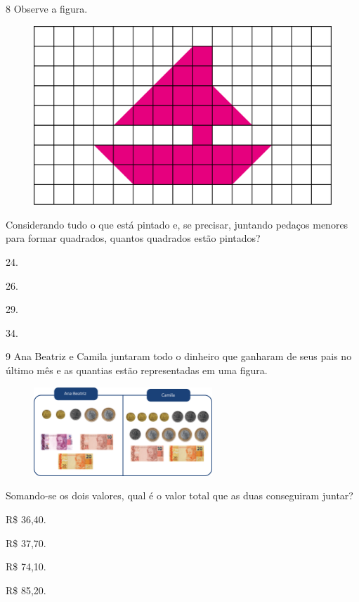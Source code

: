 \num{8} Observe a figura.

\begin{figure}[htpb!]
\centering
\includegraphics[width=.6\textwidth]{./media/image94.png}
\end{figure}

Considerando tudo o que está pintado e, se precisar, juntando pedaços
menores para formar quadrados, quantos quadrados estão pintados?

\begin{escolha}
\item
  24.
\item
  26.
\item
  29.
\item
  34.
\end{escolha}

\pagebreak
\num{9} Ana Beatriz e Camila juntaram todo o dinheiro que ganharam de seus pais no
último mês e as quantias estão representadas em uma figura.

\begin{figure}[htpb!]
\centering
\includegraphics[width=0.6\textwidth]{./media/image95.png}
\end{figure}

Somando-se os dois valores, qual é o valor total que as duas conseguiram juntar?

\begin{multicols}{2}
\begin{escolha}
\item
  R\$ 36,40.
\item
  R\$ 37,70.
\item
  R\$ 74,10.
\item
  R\$ 85,20.
\end{escolha}
\end{multicols}

